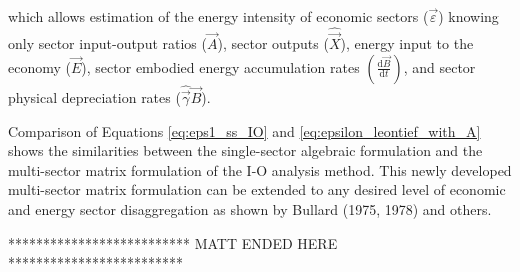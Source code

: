 \noindent which allows estimation of the energy intensity of economic sectors ($\vec{\varepsilon}$) knowing only sector input-output ratios ($\vec{A}$), sector outputs ($\hat{\vec{X}}$), energy input to the economy ($\vec{E}$), sector embodied energy accumulation rates $\left(\frac{\mathrm{d}\vec{B}}{\mathrm{d}t}\right)$, and sector physical depreciation rates ($\hat{\vec{\gamma}}\vec{B}$).

Comparison of Equations \ref{eq:eps1_ss_IO} and \ref{eq:epsilon_leontief_with_A} shows the similarities between the single-sector algebraic formulation and the multi-sector matrix formulation of the I-O analysis method. This newly developed multi-sector matrix formulation can be extended to any desired level of economic and energy sector disaggregation as shown by Bullard (1975, 1978) and others.

************************** MATT ENDED HERE *************************








%
%



